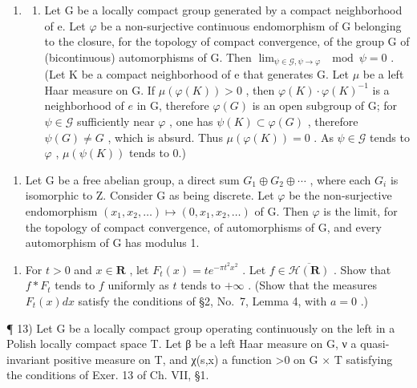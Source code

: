 \begin{enumerate}
\def\labelenumi{\arabic{enumi})}
\setcounter{enumi}{10}
\tightlist
\item
  \begin{enumerate}
  \def\labelenumii{\alph{enumii})}
  \tightlist
  \item
    Let G be a locally compact group generated by a compact neighborhood of e. Let \(\varphi\) be a non-surjective continuous endomorphism of G belonging to the closure, for the topology of compact convergence, of the group G of (bicontinuous) automorphisms of G. Then \(\lim_{\psi\in\mathcal{G},\psi\to\varphi}\mod\psi=0\) . (Let K be a compact neighborhood of e that generates G. Let \(\mu\) be a left Haar measure on G. If \(\mu(\varphi(K)) > 0\) , then \(\varphi(K) \cdot \varphi(K)^{-1}\) is a neighborhood of \(e\) in G, therefore \(\varphi(G)\) is an open subgroup of G; for \(\psi \in \mathcal{G}\) sufficiently near \(\varphi\) , one has \(\psi(K) \subset \varphi(G)\) , therefore \(\psi(G) \neq G\) , which is absurd. Thus \(\mu(\varphi(K)) = 0\) . As \(\psi \in \mathcal{G}\) tends to \(\varphi\) , \(\mu(\psi(K))\) tends to 0.)
  \end{enumerate}
\end{enumerate}

\begin{enumerate}
\def\labelenumi{\alph{enumi})}
\setcounter{enumi}{1}
\tightlist
\item
  Let G be a free abelian group, a direct sum \(G_{1} \oplus G_{2} \oplus \cdots\) , where each \(G_{i}\) is isomorphic to Z. Consider G as being discrete. Let \(\varphi\) be the non-surjective endomorphism \((x_{1}, x_{2}, \ldots) \mapsto (0, x_{1}, x_{2}, \ldots)\) of G. Then \(\varphi\) is the limit, for the topology of compact convergence, of automorphisms of G, and every automorphism of G has modulus 1.
\end{enumerate}

\begin{enumerate}
\def\labelenumi{\arabic{enumi})}
\setcounter{enumi}{11}
\tightlist
\item
  For \(t > 0\) and \(x \in \mathbf{R}\) , let \(F_t(x) = te^{-\pi t^2 x^2}\) . Let \(f \in \overline{\mathcal{H}(\mathbf{R})}\) . Show that \(f * F_t\) tends to \(f\) uniformly as \(t\) tends to \(+\infty\) . (Show that the measures \(F_t(x) dx\) satisfy the conditions of §2, No.~7, Lemma 4, with \(a = 0\) .)
\end{enumerate}

¶ 13) Let G be a locally compact group operating continuously on the left in a Polish locally compact space T. Let β be a left Haar measure on G, ν a quasi-invariant positive measure on T, and χ(s,x) a function \textgreater0 on G × T satisfying the conditions of Exer. 13 of Ch. VII, §1.

